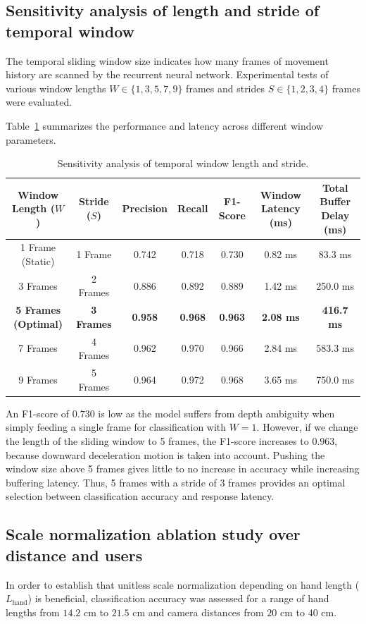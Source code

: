 \subsection{Sensitivity analysis of length and stride of temporal window}
\label{subsec:test_window_sensitivity}
The temporal sliding window size indicates how many frames of movement history are scanned by the recurrent neural network. Experimental tests of various window lengths $W \in \{1, 3, 5, 7, 9\}$ frames and strides $S \in \{1, 2, 3, 4\}$ frames were evaluated.

Table~\ref{tab:window_length_sensitivity} summarizes the performance and latency across different window parameters.

\begin{table}[htbp]
\centering
\caption{Sensitivity analysis of temporal window length and stride.}
\label{tab:window_length_sensitivity}
\begin{tabular}{c c c c c c c}
\toprule
\textbf{Window Length ($W$)} & \textbf{Stride ($S$)} & \textbf{Precision} & \textbf{Recall} & \textbf{F1-Score} & \textbf{Window Latency (ms)} & \textbf{Total Buffer Delay (ms)} \\
\midrule
1 Frame (Static) & 1 Frame & 0.742 & 0.718 & 0.730 & 0.82 ms & 83.3 ms \\
3 Frames & 2 Frames & 0.886 & 0.892 & 0.889 & 1.42 ms & 250.0 ms \\
\textbf{5 Frames (Optimal)} & \textbf{3 Frames} & \textbf{0.958} & \textbf{0.968} & \textbf{0.963} & \textbf{2.08 ms} & \textbf{416.7 ms} \\
7 Frames & 4 Frames & 0.962 & 0.970 & 0.966 & 2.84 ms & 583.3 ms \\
9 Frames & 5 Frames & 0.964 & 0.972 & 0.968 & 3.65 ms & 750.0 ms \\
\bottomrule
\end{tabular}%
\end{table}

An F1-score of $0.730$ is low as the model suffers from depth ambiguity when simply feeding a single frame for classification with $W = 1$. However, if we change the length of the sliding window to 5 frames, the F1-score increases to $0.963$, because downward deceleration motion is taken into account. Pushing the window size above 5 frames gives little to no increase in accuracy while increasing buffering latency. Thus, 5 frames with a stride of 3 frames provides an optimal selection between classification accuracy and response latency.

\subsection{Scale normalization ablation study over distance and users}
\label{subsec:test_scale_ablation}
In order to establish that unitless scale normalization depending on hand length ($L_{\text{hand}}$) is beneficial, classification accuracy was assessed for a range of hand lengths from $14.2\text{ cm}$ to $21.5\text{ cm}$ and camera distances from $20\text{ cm}$ to $40\text{ cm}$.

